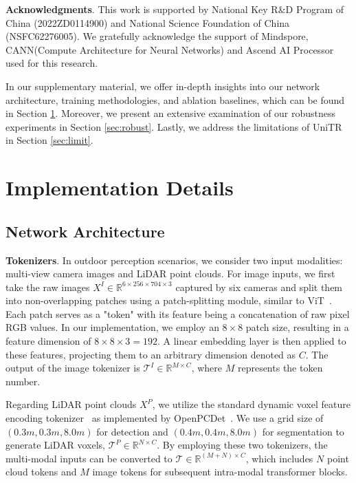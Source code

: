 \documentclass[10pt,twocolumn,letterpaper]{article}
\begin{document}
\noindent \textbf{Acknowledgments}. This work is supported by National Key R\&D Program of China (2022ZD0114900) and National Science Foundation of China (NSFC62276005). We gratefully acknowledge the support of Mindspore, CANN(Compute Architecture for Neural Networks) and Ascend AI Processor used for this research. 

{\small


}

\newpage
\appendix

In our supplementary material, we offer in-depth insights into our network architecture, training methodologies, and ablation baselines, which can be found in Section \ref{sec:imple_app}. Moreover, we present an extensive examination of our robustness experiments in Section \ref{sec:robust}. Lastly, we address the limitations of UniTR in Section \ref{sec:limit}.
\section{Implementation Details} \label{sec:imple_app}
\subsection{Network Architecture}
\noindent \textbf{Tokenizers}. In outdoor perception scenarios, we consider two input modalities: multi-view camera images and LiDAR point clouds. For image inputs, we first take the raw images $X^I \in \mathbb{R}^{6 \times 256 \times 704 \times 3}$ captured by six cameras and split them into non-overlapping patches using a patch-splitting module, similar to ViT~\cite{dosovitskiy2021an}. Each patch serves as a "token" with its feature being a concatenation of raw pixel RGB values. In our implementation, we employ an $8 \times 8$ patch size, resulting in a feature dimension of $8 \times 8 \times 3 = 192$. A linear embedding layer is then applied to these features, projecting them to an arbitrary dimension denoted as $C$. The output of the image tokenizer is $\mathcal{T}^I \in \mathbb{R}^{M \times C}$, where $M$ represents the token number.

Regarding LiDAR point clouds $X^P$, we utilize the standard dynamic voxel feature encoding tokenizer~\cite{zhou2020end} as implemented by OpenPCDet~\cite{openpcdet2020}. We use a grid size of $(0.3m, 0.3m, 8.0m)$ for detection and $(0.4m, 0.4m, 8.0m)$ for segmentation to generate LiDAR voxels, $\mathcal{T}^{P} \in \mathbb{R}^{N \times C}$. By employing these two tokenizers, the multi-modal inputs can be converted to $\mathcal{T} \in \mathbb{R}^{(M+N) \times C}$, which includes $N$ point cloud tokens and $M$ image tokens for subsequent intra-modal transformer blocks.
\end{document}
